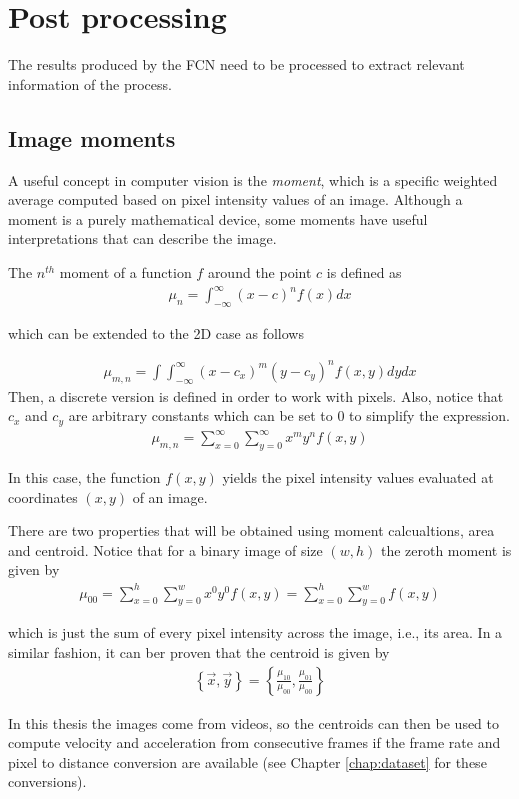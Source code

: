 \section{Post processing}

The results produced by the FCN need to be processed to extract relevant information of the process.

\subsection{Image moments}
A useful concept in computer vision is the \textit{moment}, which is a specific weighted average computed based on pixel intensity values of an image. Although a moment is a purely mathematical device, some moments have useful interpretations that can describe the image.

The $n^{th}$ moment of a function $f$ around the point $c$ is defined as 
\begin{align*}
    \mu_n=\int_{-\infty}^{\infty}(x-c)^nf(x)dx
\end{align*}

which can be extended to the 2D case as follows

\begin{align*}
    \mu_{m,n}=\int\int_{-\infty}^{\infty}(x-c_x)^m(y-c_y)^nf(x,y)dydx
\end{align*}
Then, a discrete version is defined in order to work with pixels. Also, notice that $c_x$ and $c_y$ are arbitrary constants which can be set to $0$ to simplify the expression.
\begin{align*}
    \mu_{m,n}=\sum_{x=0}^{\infty}\sum_{y=0}^{\infty}x^my^nf(x,y)
\end{align*}

In this case, the function $f(x,y)$ yields the pixel intensity values evaluated at coordinates $(x,y)$ of an image.

There are two properties that will be obtained using moment calcualtions, area and centroid. Notice that for a binary image of size $(w, h)$ the zeroth moment is given by
\begin{align*}
    \mu_{00}=\sum_{x=0}^{h}\sum_{y=0}^{w}x^0y^0f(x,y) = \sum_{x=0}^{h}\sum_{y=0}^{w}f(x,y)
\end{align*}

which is just the sum of every pixel intensity across the image, i.e., its area. In a similar fashion, it can ber proven that the centroid is given by
\begin{align*}
    \left\{\Vec{x},\Vec{y}\right\}=\left\{\frac{\mu_{10}}{\mu_{00}},\frac{\mu_{01}}{\mu_{00}}\right\}
\end{align*}

In this thesis the images come from videos, so the centroids can then be used to compute velocity and acceleration from consecutive frames if the frame rate and pixel to distance conversion are available (see Chapter \ref{chap:dataset} for these conversions).
